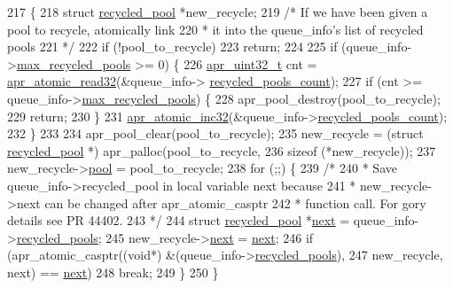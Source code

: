 \begin{DoxyCode}
217 \{
218     \textcolor{keyword}{struct }\hyperlink{structrecycled__pool}{recycled\_pool} *new\_recycle;
219     \textcolor{comment}{/* If we have been given a pool to recycle, atomically link}
220 \textcolor{comment}{     * it into the queue\_info's list of recycled pools}
221 \textcolor{comment}{     */}
222     \textcolor{keywordflow}{if} (!pool\_to\_recycle)
223         \textcolor{keywordflow}{return};
224 
225     \textcolor{keywordflow}{if} (queue\_info->\hyperlink{structfd__queue__info__t_ac83918a33f9efbcb3c79ca208358d5f3}{max\_recycled\_pools} >= 0) \{
226         \hyperlink{group__apr__platform_ga558548a135d8a816c4787250744ea147}{apr\_uint32\_t} cnt = \hyperlink{atomic_8c_afba4de90e113d26536cff48418689771}{apr\_atomic\_read32}(&queue\_info->
      \hyperlink{structfd__queue__info__t_af10c530322499a45a7ceff4dee6047e0}{recycled\_pools\_count});
227         \textcolor{keywordflow}{if} (cnt >= queue\_info->\hyperlink{structfd__queue__info__t_ac83918a33f9efbcb3c79ca208358d5f3}{max\_recycled\_pools}) \{
228             apr\_pool\_destroy(pool\_to\_recycle);
229             \textcolor{keywordflow}{return};
230         \}
231         \hyperlink{atomic_8c_a4af33da5aa6493ec321af14bedfc47a9}{apr\_atomic\_inc32}(&queue\_info->\hyperlink{structfd__queue__info__t_af10c530322499a45a7ceff4dee6047e0}{recycled\_pools\_count});
232     \}
233 
234     apr\_pool\_clear(pool\_to\_recycle);
235     new\_recycle = (\textcolor{keyword}{struct }\hyperlink{structrecycled__pool}{recycled\_pool} *) apr\_palloc(pool\_to\_recycle,
236                                                       \textcolor{keyword}{sizeof} (*new\_recycle));
237     new\_recycle->\hyperlink{structrecycled__pool_a7a9db88b8ae2ec367708d457b29e7d22}{pool} = pool\_to\_recycle;
238     \textcolor{keywordflow}{for} (;;) \{
239         \textcolor{comment}{/*}
240 \textcolor{comment}{         * Save queue\_info->recycled\_pool in local variable next because}
241 \textcolor{comment}{         * new\_recycle->next can be changed after apr\_atomic\_casptr}
242 \textcolor{comment}{         * function call. For gory details see PR 44402.}
243 \textcolor{comment}{         */}
244         \textcolor{keyword}{struct }\hyperlink{structrecycled__pool}{recycled\_pool} *\hyperlink{structrecycled__pool_a6c607a84f541b580419d94ec5313c25a}{next} = queue\_info->\hyperlink{structfd__queue__info__t_ac4e7511417ba04c774bf0576cba54dc2}{recycled\_pools};
245         new\_recycle->\hyperlink{structrecycled__pool_a6c607a84f541b580419d94ec5313c25a}{next} = \hyperlink{structrecycled__pool_a6c607a84f541b580419d94ec5313c25a}{next};
246         \textcolor{keywordflow}{if} (apr\_atomic\_casptr((\textcolor{keywordtype}{void}*) &(queue\_info->\hyperlink{structfd__queue__info__t_ac4e7511417ba04c774bf0576cba54dc2}{recycled\_pools}),
247                               new\_recycle, next) == \hyperlink{structrecycled__pool_a6c607a84f541b580419d94ec5313c25a}{next})
248             \textcolor{keywordflow}{break};
249     \}
250 \}
\end{DoxyCode}


